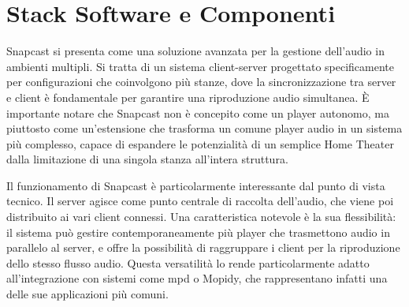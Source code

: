 \section{Stack Software e Componenti}
\noindent

Snapcast si presenta come una soluzione avanzata per la gestione dell'audio in ambienti multipli.  Si tratta di un sistema client-server progettato specificamente per configurazioni che coinvolgono più stanze, dove la sincronizzazione tra server e client è fondamentale per garantire una riproduzione audio simultanea. È importante notare che Snapcast non è concepito come un player autonomo, ma piuttosto come un'estensione che trasforma un comune player audio in un sistema più complesso, capace di espandere le potenzialità di un semplice Home Theater dalla limitazione di una singola stanza all'intera struttura.

Il funzionamento di Snapcast è particolarmente interessante dal punto di vista tecnico. Il server agisce come punto centrale di raccolta dell'audio, che viene poi distribuito ai vari client connessi. Una caratteristica notevole è la sua flessibilità: il sistema può gestire contemporaneamente più player che trasmettono audio in parallelo al server, e offre la possibilità di raggruppare i client per la riproduzione dello stesso flusso audio. Questa versatilità lo rende particolarmente adatto all'integrazione con sistemi come \gls{mpd} o Mopidy, che rappresentano infatti una delle sue applicazioni più comuni.


